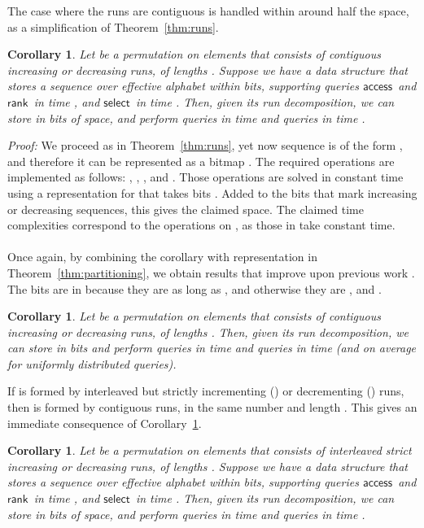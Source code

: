 \documentclass[11pt]{article}
\newtheorem{corollary}[theorem]{Corollary}
\newenvironment{proof}{\textit{Proof:}}{\hfill \paragraph{} }
\newcommand{\access}
    {\ensuremath{\mathsf{access}}}
\newcommand{\rank}
    {\ensuremath{\mathsf{rank}}}
\newcommand{\select}
    {\ensuremath{\mathsf{select}}}
\begin{document}
\begin{table}[t]
{\begin{tabular}
\smallskip

The case where the runs are contiguous is handled within around half the 
space, as a simplification of Theorem~\ref{thm:runs}.

\begin{corollary} \label{cor:contruns-gral}
  Let  be a permutation on  elements that consists of 
  contiguous increasing or decreasing runs, of lengths .
  Suppose we have a data structure that stores a sequence 
  over effective alphabet  within  bits,
  supporting queries \access\ and \rank\ in time , 
  and \select\ in time .
Then, given its run decomposition, we can store  in 
   bits of 
  space, and perform  queries in time  and 
   queries in time .
\end{corollary}
\begin{proof}
We proceed as in Theorem~\ref{thm:runs}, yet now sequence  is of the form
, and therefore it can be represented
as a bitmap . The required
operations are implemented as follows: ,
,
,
and . Those operations are solved in
constant time using a representation for  that takes
 bits
\cite{RRR02}. Added to the  bits that mark increasing or decreasing
sequences, this gives the claimed space. The claimed time complexities 
correspond to the operations on , as those in  take constant time.
\end{proof}

Once again, by combining the corollary with representation  in 
Theorem~\ref{thm:partitioning}, we 
obtain results that improve upon previous work \cite{BN09,BN11}.
The  bits are in  
because they are  as long as , and otherwise they are
, and .

\begin{corollary} \label{cor:contruns}
  Let  be a permutation on  elements that consists of 
  contiguous increasing or decreasing runs, of lengths .
Then, given its run decomposition, we can store  in 
   bits and 
  perform  queries in time  and  queries in
  time  (and  on average for 
  uniformly distributed queries).
\end{corollary}

\smallskip

If  is formed by interleaved but strictly incrementing () or 
decrementing () runs, then  is formed by contiguous runs,
in the same number and length \cite{BN09}. This gives an immediate 
consequence of Corollary~\ref{cor:contruns-gral}.

\begin{corollary} \label{cor:strict_runs}
  Let  be a permutation on  elements that consists of 
  interleaved strict increasing or decreasing runs, of lengths .
  Suppose we have a data structure that stores a sequence 
  over effective alphabet  within  bits,
  supporting queries \access\ and \rank\ in time , 
  and \select\ in time .
Then, given its run decomposition, we can store  in 
   bits of 
  space, and perform  queries in time  
  and  queries in time .
\end{corollary}


\end{tabular}}
\end{table}
\end{document}
